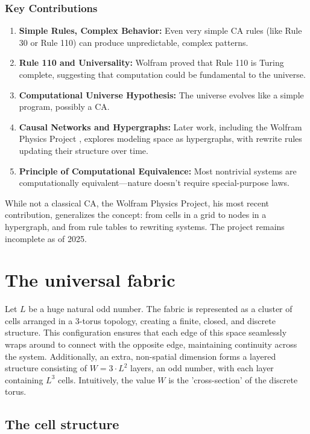 \documentclass[12pt]{article}
\begin{document}
\subsubsection*{Key Contributions}
\begin{enumerate}
  \item \textbf{Simple Rules, Complex Behavior:} Even very simple CA rules (like Rule 30 or Rule 110) can produce unpredictable, complex patterns.
  \item \textbf{Rule 110 and Universality:} Wolfram proved that Rule 110 is Turing complete, suggesting that computation could be fundamental to the universe.
  \item \textbf{Computational Universe Hypothesis:} The universe evolves like a simple program, possibly a CA.
  \item \textbf{Causal Networks and Hypergraphs:} Later work, including the Wolfram Physics Project \cite{wolfram2020physics}, explores modeling space as hypergraphs, with rewrite rules updating their structure over time.
  \item \textbf{Principle of Computational Equivalence:} Most nontrivial systems are computationally equivalent—nature doesn't require special-purpose laws.
\end{enumerate}

While not a classical CA, the Wolfram Physics Project, his most recent contribution, generalizes the concept: from cells in a grid to nodes in a hypergraph, and from rule tables to rewriting systems. The project remains incomplete as of 2025.

\section{The universal fabric \label{sec:space-and-time}}

Let \ensuremath{L} be a huge natural odd number. The fabric is represented as a cluster of cells arranged in a 3-torus topology, creating a finite, closed, and discrete structure. This configuration ensures that each edge of this space seamlessly wraps around to connect with the opposite edge, maintaining continuity across the system. Additionally, an extra, non-spatial dimension forms a layered structure consisting of $W  =3\cdot L^2$ layers, an odd number, with each layer containing $L^{3}$ cells. Intuitively, the value $W  $ is the 'cross-section' of the discrete torus.

\subsection{The cell structure \label{subsec:The-cell-structure}}
\end{document}
